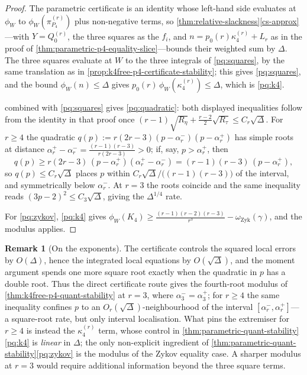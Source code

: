 \documentclass[11pt]{article}
\theoremstyle{definition}
\newtheorem{remark}[remark]{Remark}
\begin{document}
\begin{proof}
The parametric certificate is an identity whose left-hand side evaluates at $\phi_W$ to
$\phi_W(\pi_{P_4}^{(r)})$ plus non-negative terms, so
\cref{thm:relative-slackness}\ref{cs-approx}---with $Y=Q_0^{(r)}$, the three squares as
the $f_i$, and $n=p_0(r)\kappa_4^{(r)}+L_r$ as in the proof of
\cref{thm:parametric-p4-equality-slice}---bounds their weighted sum by $\Delta$.  The
three squares evaluate at $W$ to the three integrals of \ref{pq:squares}, by the same
translation as in \cref{prop:k4free-p4-certificate-stability}; this gives
\ref{pq:squares}, and the bound $\phi_W(n)\le\Delta$ gives
$p_0(r)\,\phi_W(\kappa_4^{(r)})\le\Delta$, which is \ref{pq:k4}.

 combined with \ref{pq:squares} gives \ref{pq:quadratic}:
both displayed inequalities follow from the identity in that proof once
$(r-1)\sqrt{R_\eta}+\frac{r-2}2\sqrt{R_\tau}\le C_r\sqrt\Delta$.  For $r\ge4$ the
quadratic $q(p):=r(2r-3)(p-\alpha_r^-)(p-\alpha_r^+)$ has simple roots at distance
$\alpha_r^+-\alpha_r^-=\frac{(r-1)(r-3)}{r(2r-3)}>0$; if, say, $p>\alpha_r^+$, then
\[
  q(p)\ge r(2r-3)\,(p-\alpha_r^+)(\alpha_r^+-\alpha_r^-)
  =(r-1)(r-3)\,(p-\alpha_r^+),
\]
so $q(p)\le C_r\sqrt\Delta$ places $p$ within $C_r\sqrt\Delta/\bigl((r-1)(r-3)\bigr)$
of the interval, and symmetrically below $\alpha_r^-$.  At $r=3$ the roots coincide and
the same inequality reads $(3p-2)^2\le C_3\sqrt\Delta$, giving the $\Delta^{1/4}$ rate.

For \ref{pq:zykov}, \ref{pq:k4} gives
$\phi_W(K_4)\ge\frac{(r-1)(r-2)(r-3)}{r^3}-\omega_{\mathrm{Zyk}}(\gamma)$, and the
modulus applies.
\end{proof}

\begin{remark}[On the exponents]
The certificate controls the squared local errors by $O(\Delta)$, hence the integrated
local equations by $O(\sqrt\Delta)$, and the moment argument spends one more square root
exactly when the quadratic in $p$ has a double root.  Thus the direct certificate route
gives the fourth-root modulus of \cref{thm:k4free-p4-quant-stability} at $r=3$, where
$\alpha_3^-=\alpha_3^+$; for $r\ge4$ the same inequality confines $p$ to an
$O_r(\sqrt\Delta)$-neighbourhood of the interval $[\alpha_r^-,\alpha_r^+]$---a
square-root rate, but only interval localisation.  What pins the extremiser for
$r\ge4$ is instead the $\kappa_4^{(r)}$ term, whose control in
\cref{thm:parametric-quant-stability}\ref{pq:k4} is \emph{linear} in $\Delta$; the only
non-explicit ingredient of \cref{thm:parametric-quant-stability}\ref{pq:zykov} is the
modulus of the Zykov equality case.  A sharper modulus at $r=3$ would require additional
information beyond the three square terms.
\end{remark}
\end{document}
